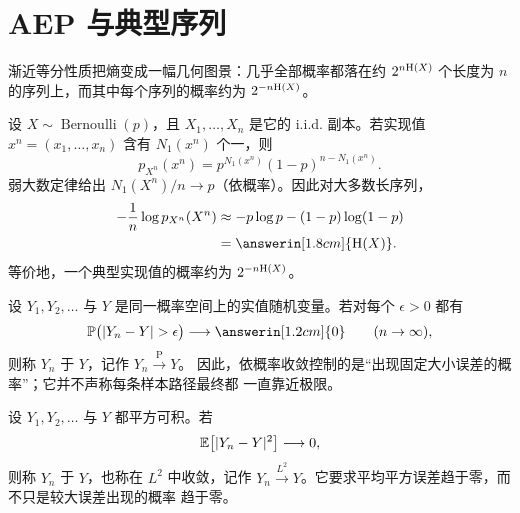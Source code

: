 \section{AEP 与典型序列}\label{sec:aep}
\quad{}

\begin{strand}
渐近等分性质把熵变成一幅几何图景：几乎全部概率都落在约 $2^{n\mathrm{H}(X)}$ 个长度为
$n$ 的序列上，而其中每个序列的概率约为 $2^{-n\mathrm{H}(X)}$。
\end{strand}



\begin{example}[数零与一]
设 $X\sim\operatorname{Bernoulli}(p)$，且 $X_1,\ldots,X_n$ 是它的 i.i.d.
副本。若实现值 $x^n=(x_1,\ldots,x_n)$ 含有 $N_1(x^n)$ 个一，则
\[
  p_{X^n}(x^n)=p^{N_1(x^n)}(1-p)^{n-N_1(x^n)}.
\]
弱大数定律给出 $N_1(X^n)/n\to p$（依概率）。因此对大多数长序列，
\[
\begin{aligned}
  -\frac1n\log p_{X^n}(X^n)
  &\approx -p\log p-(1-p)\log(1-p)\\
  &=\answerin[1.8cm]{\Ent(X)}.
\end{aligned}
\]
等价地，一个典型实现值的概率约为 $2^{-n\mathrm{H}(X)}$。
\end{example}


\begin{definition}[依概率收敛]\label{def:convergence-in-probability}
设 $Y_1,Y_2,\ldots$ 与 $Y$ 是同一概率空间上的实值随机变量。若对每个
$\epsilon>0$ 都有
\[
  \PP\bigl(|Y_n-Y|>\epsilon\bigr)
  \longrightarrow \answerin[1.2cm]{0}
  \qquad(n\to\infty),
\]
则称 $Y_n$ 于 $Y$，记作 $Y_n\xrightarrow{\mathrm{P}}Y$。
因此，依概率收敛控制的是“出现固定大小误差的概率”；它并不声称每条样本路径最终都
一直靠近极限。
\end{definition}

\begin{definition}[均方收敛]\label{def:mean-square-convergence}
设 $Y_1,Y_2,\ldots$ 与 $Y$ 都平方可积。若
\[
  \mathbb{E}\!\left[|Y_n-Y|^2\right]\longrightarrow0,
\]
则称 $Y_n$ 于 $Y$，也称在 $L^2$ 中收敛，记作
$Y_n\xrightarrow{L^2}Y$。它要求平均平方误差趋于零，而不只是较大误差出现的概率
趋于零。
\end{definition}

